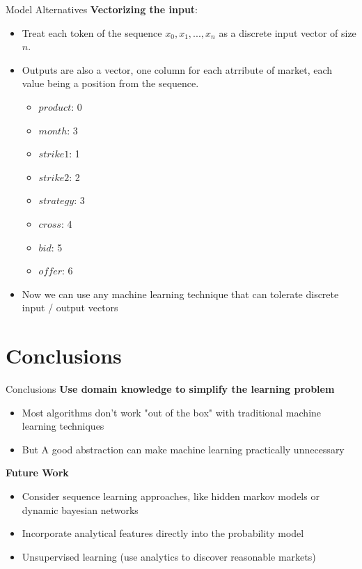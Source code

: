 \documentclass{beamer}
\begin{document}
\begin{frame}{Model Alternatives}
\textbf{Vectorizing the input}:
\begin{itemize}
 \item Treat each token of the sequence $x_0, x_1, ... , x_n$ as a discrete input vector of size $n$.
 \item Outputs are also a vector, one column for each atrribute of market, each value being a position from the sequence.
  \begin{itemize}
  	\item $product$: 0
    \item $month$: 3
    \item $strike1$: 1 
    \item $strike2$: 2
    \item $strategy$: 3
    \item $cross$: 4
    \item $bid$: 5
    \item $offer$: 6 
  \end{itemize}
\item Now we can use any machine learning technique that can tolerate discrete input / output vectors
\end{itemize}
\end{frame}

\section*{Conclusions}

\begin{frame}{Conclusions}
\textbf{Use domain knowledge to simplify the learning problem}
\begin{itemize}
 \item Most algorithms don't work "out of the box" with traditional machine learning techniques 
 \pause
 \item But A good abstraction can make machine learning practically unnecessary
\end{itemize}
\textbf{Future Work}
\begin{itemize}
 \item Consider sequence learning approaches, like hidden markov models or dynamic bayesian networks
 \item Incorporate analytical features directly into the probability model
 \item Unsupervised learning (use analytics to discover reasonable markets)
\end{itemize}
\end{frame}
\end{document}
